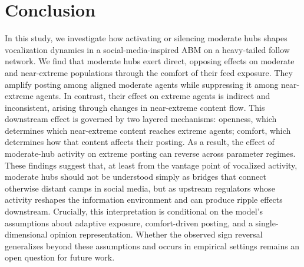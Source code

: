 \documentclass{svproc}
\begin{document}
\section{Conclusion}\label{sec:conclusion}
In this study, we investigate how activating or silencing 
moderate hubs shapes vocalization dynamics in a 
social-media-inspired ABM on a heavy-tailed follow network. 
We find that moderate hubs exert direct, opposing 
effects on moderate and near-extreme populations 
through the comfort of their feed exposure. 
They amplify posting among aligned moderate agents 
while suppressing it among near-extreme agents. 
In contrast, their effect on extreme agents is indirect 
and inconsistent, 
arising through changes in near-extreme content flow. 
This downstream effect is governed by two 
layered mechanisms: openness, which determines 
which near-extreme content reaches extreme agents; 
comfort, which determines how that content 
affects their posting. 
As a result, the effect of moderate-hub activity 
on extreme posting can reverse across parameter regimes. 
These findings suggest that, at least from the vantage point of
vocalized activity, moderate hubs should not
be understood simply as bridges that connect otherwise
distant camps in social media, but as upstream
regulators whose activity reshapes the information
environment and can produce ripple effects downstream.
Crucially, this interpretation is conditional on the model's
assumptions about adaptive exposure, comfort-driven
posting, and a single-dimensional opinion representation. Whether the observed sign reversal generalizes
beyond these assumptions and occurs in empirical settings 
remains an open question for future work.



\end{document}
